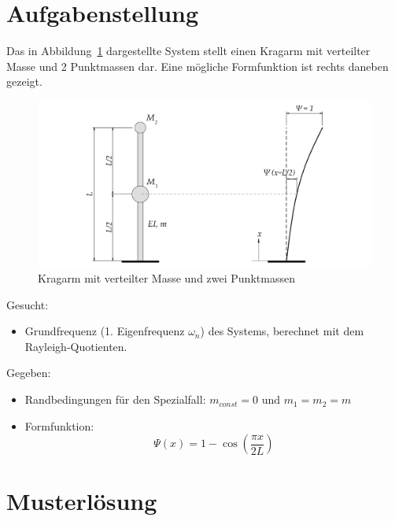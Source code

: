 \documentclass[
  letterpaper,
  DIV=11]{scrreprt}
\providecommand{\tightlist}{%
  \setlength{\itemsep}{0pt}\setlength{\parskip}{0pt}}\usepackage{longtable,booktabs,array}
\begin{document}
\hypertarget{aufgabenstellung}{%
\section{Aufgabenstellung}\label{aufgabenstellung}}

Das in Abbildung~\ref{fig-kragarm_2_punkte} dargestellte System stellt
einen Kragarm mit verteilter Masse und 2 Punktmassen dar. Eine mögliche
Formfunktion ist rechts daneben gezeigt.

\begin{figure}[H]

{\centering \includegraphics{index_files/mediabag/bilder/aufgabe_rayleigh_2_massen.pdf}

}

\caption{\label{fig-kragarm_2_punkte}Kragarm mit verteilter Masse und
zwei Punktmassen}

\end{figure}

Gesucht:

\begin{itemize}
\tightlist
\item
  Grundfrequenz (1. Eigenfrequenz \(\omega_n\)) des Systems, berechnet
  mit dem Rayleigh-Quotienten.
\end{itemize}

Gegeben:

\begin{itemize}
\tightlist
\item
  Randbedingungen für den Spezialfall:
  \(m_{const} = 0 \text{ und } m_1 = m_2 = m\)
\item
  Formfunktion: \[ \Psi(x) = 1 - \cos(\frac{\pi x}{2L})\]
\end{itemize}

\newpage{}

\hypertarget{sec-ml_2punktmassen}{%
\section{Musterlösung}\label{sec-ml_2punktmassen}}
\end{document}
